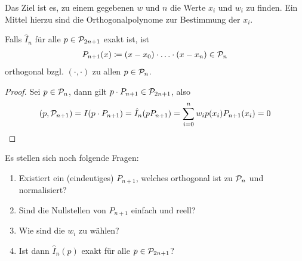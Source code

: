 Das Ziel ist es, zu einem gegebenen $w$ und $n$
die Werte $x_i$ und $w_i$ zu finden.
Ein Mittel hierzu sind die Orthogonalpolynome
zur Bestimmung der $x_i$.


\begin{Leme}
  \label{7.4.3}
  Falls $\hat{I}_n$ für alle $p\in\mathcal{P}_{2n+1}$ exakt ist, ist 
  \begin{gather*}
    P_{n+1}(x)\coloneqq (x-x_0)\cdot \ldots\cdot (x-x_n)\in\mathcal{P}_n
  \end{gather*}
  orthogonal bzgl. $(\cdot,\cdot)$ zu allen $p\in\mathcal{P}_n$.

  \begin{proof}
    Sei $p\in\mathcal{P}_n$, dann gilt 
    $p\cdot P_{n+1}\in\mathcal{P}_{2n+1}$, also 
    \begin{gather*}
      (p,\mathcal{P}_{n+1})=I(p\cdot P_{n+1})
      = \hat{I}_n(pP_{n+1})
      =\sum_{i=0}^nw_ip(x_i)P_{n+1}(x_i) 
      = 0
    \end{gather*}
  \end{proof}

  Es stellen sich noch folgende Fragen:
  \begin{enumerate}
  \item Existiert ein (eindeutiges) $P_{n+1}$,
    welches orthogonal ist zu $\mathcal{P}_n$ und normalisiert?
  \item Sind die Nullstellen von $P_{n+1}$ einfach und reell?
  \item Wie sind die $w_i$ zu wählen?
  \item Ist dann $\hat{I}_n(p)$ exakt für alle $p\in\mathcal{P}_{2n+1}$?
  \end{enumerate}
\end{Leme}

